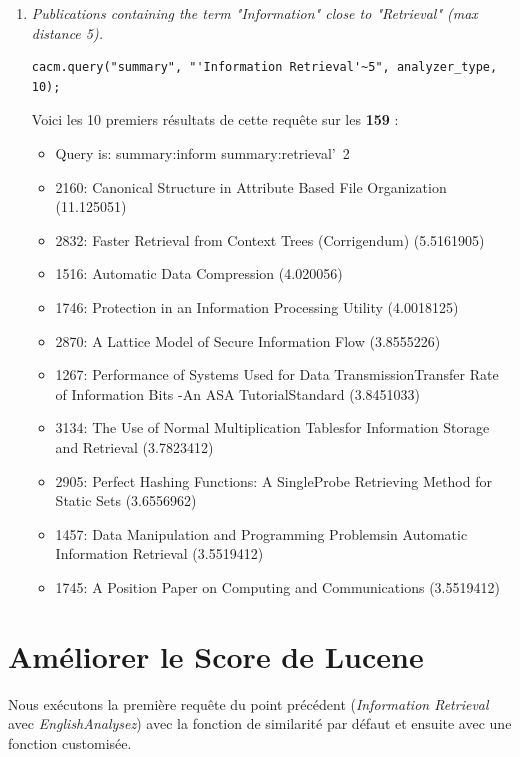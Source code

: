 \begin{enumerate}
\item \textit{Publications containing the term "Information" close to "Retrieval" (max distance 5).}

\begin{lstlisting}
cacm.query("summary", "'Information Retrieval'~5", analyzer_type, 10);
\end{lstlisting}

Voici les 10 premiers résultats de cette requête sur les \textbf{159} :

\begin{itemize}
    \item Query is: summary:inform summary:retrieval'~2
    \item 2160: Canonical Structure in Attribute Based File Organization (11.125051)
    \item 2832: Faster Retrieval from Context Trees (Corrigendum) (5.5161905)
    \item 1516: Automatic Data Compression (4.020056)
    \item 1746: Protection in an Information Processing Utility (4.0018125)
    \item 2870: A Lattice Model of Secure Information Flow (3.8555226)
    \item 1267: Performance of Systems Used for Data TransmissionTransfer Rate of Information Bits -An ASA TutorialStandard (3.8451033)
    \item 3134: The Use of Normal Multiplication Tablesfor Information Storage and Retrieval (3.7823412)
    \item 2905: Perfect Hashing Functions: A SingleProbe Retrieving Method for Static Sets (3.6556962)
    \item 1457: Data Manipulation and Programming Problemsin Automatic Information Retrieval (3.5519412)
    \item 1745: A Position Paper on Computing and Communications (3.5519412)\\
\end{itemize}

\end{enumerate}

\section{Améliorer le Score de Lucene}

Nous exécutons la première requête du point précédent (\textit{Information Retrieval} avec \textit{EnglishAnalysez}) avec la fonction de similarité par défaut et ensuite avec une fonction customisée.

